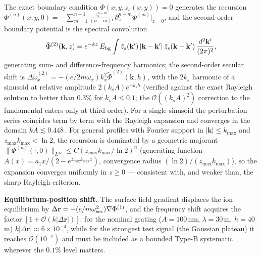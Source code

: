 \documentclass[12pt,a4paper]{article}
\begin{document}
The exact boundary condition $\Phi(x,y,z_s(x,y))=0$ generates the
recursion
$\Phi^{(n)}(x,y,0)=-\sum_{m=1}^{n-1}\frac{z_s^{n-m}}{(n-m)!}\,\partial_z^{n-m}\Phi^{(m)}|_{z=0}$,
and the second-order boundary potential is the spectral convolution
\begin{equation}
\tilde{\Phi}^{(2)}(\mathbf{k},z) = e^{-kz}\,E_{\rm bg}
    \int \tilde z_s(\mathbf{k}')\,|\mathbf{k}-\mathbf{k}'|\,
    \tilde z_s(\mathbf{k}-\mathbf{k}')\,\frac{d^2\mathbf{k}'}{(2\pi)^2},
\end{equation}
generating sum- and difference-frequency harmonics; the second-order
secular shift is $\Delta\tilde\omega_x^{(2)}=-(e/2m\omega_x)k_x^2
\tilde\Phi^{(2)}(\mathbf{k},h)$, with the $2k_s$ harmonic of a sinusoid
at relative amplitude $2(k_sA)e^{-k_sh}$ (verified against the exact
Rayleigh solution to better than $0.3\%$ for $k_sA\le0.1$; the
$\mathcal{O}((k_sA)^2)$ correction to the fundamental enters only at
third order).  For a single sinusoid the perturbation series coincides
term by term with the Rayleigh expansion and converges in the domain
$kA\lesssim0.448$\,\cite{maystre1971rayleigh,millar1973rayleigh}.  For
general profiles with Fourier support in $|\mathbf{k}|\le k_{\max}$ and
$z_{\max}k_{\max}<\ln2$, the recursion is dominated by a geometric
majorant $\|\Phi^{(n)}(\cdot,0)\|_{L^\infty}\le C(z_{\max}k_{\max}/\ln2)^n$
(generating function $A(x)=a_1x/(2-e^{z_{\max}k_{\max}x})$, convergence
radius $(\ln2)/(z_{\max}k_{\max})$), so the expansion converges uniformly
in $z\ge0$ --- consistent with, and weaker than, the sharp Rayleigh
criterion.

\textbf{Equilibrium-position shift.}  The surface field gradient displaces
the ion equilibrium by
$\Delta\mathbf{r}=-(e/m\omega_{\rm sec}^2)\nabla\Phi^{(1)}$, and the
frequency shift acquires the factor
$[1+\mathcal{O}(k|\Delta\mathbf{r}|)]$: for the nominal grating
($A=100$\,nm, $\lambda=30$\,\textmu m, $h=40$\,\textmu m)
$k|\Delta\mathbf{r}|\approx6\times10^{-4}$, while for the strongest test
signal (the Gaussian plateau) it reaches $\mathcal{O}(10^{-1})$ and must
be included as a bounded Type-B systematic wherever the $0.1\%$ level
matters.
\end{document}

